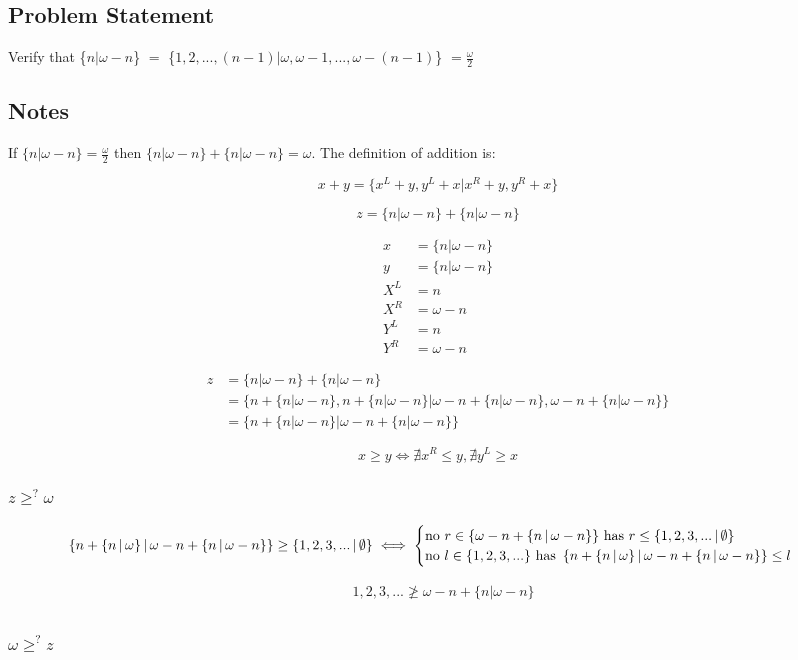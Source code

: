 \subsection*{Problem Statement}
\def \surr[#1][#2]{\{#1$|$#2\}}

Verify that \surr[$n$][$\omega - n$]
$=$
\surr[$1,2,...,(n - 1)$][$\omega, \omega - 1, ..., \omega - (n - 1)$]
$= \frac{\omega}{2}$

\subsection*{Notes}
If $\{n|\omega - n\}=\frac{\omega}{2}$ then $\{n|\omega - n\} + \{n|\omega - n\}=\omega$.  The definition of addition is:

\begin{equation*}
    x + y = \{x^L + y, y^L + x | x^R + y, y^R + x\}
\end{equation*}

\begin{equation*}
    z = \{n|\omega - n\} + \{n|\omega - n\}
\end{equation*}

\begin{align*}
    x &= \{n|\omega - n\} \\
    y &= \{n|\omega - n\} \\
    X^L &= n \\
    X^R &= \omega - n \\
    Y^L &= n \\
    Y^R &= \omega - n
\end{align*}

\begin{align*}
    z &= \{n|\omega - n\} + \{n|\omega - n\} \\
    &= \{n + \{n|\omega - n\}, n + \{n|\omega - n\} | \omega - n + \{n|\omega - n\}, \omega - n + \{n|\omega - n\}\} \\
    &= \{n + \{n|\omega - n\} | \omega - n + \{n|\omega - n\}\}
\end{align*}

\begin{equation*}
    x \geqslant y \Leftrightarrow \nexists x^R \leq y, \nexists y^L \geq x
\end{equation*}

\subsubsection*{$z \ge^? \omega$}

\surrealgeqexplain

$$\left\{n + \left\{n \,\middle|\, \omega\right\} \,\middle|\, \omega - n + \left\{n \,\middle|\, \omega - n\right\}\right\} \geq \left\{1, 2, 3, ... \,\middle|\, \emptyset\right\} \iff \begin{cases} \text{no } r \in \{\omega - n + \left\{n \,\middle|\, \omega - n\right\}\} \text{ has } r \leq \left\{1, 2, 3, ... \,\middle|\, \emptyset\right\} \\ \text{no } l \in \{1, 2, 3, ...\} \text{ has } \left\{n + \left\{n \,\middle|\, \omega\right\} \,\middle|\, \omega - n + \left\{n \,\middle|\, \omega - n\right\}\right\} \leq l \end{cases}$$

\begin{align*}
    &1, 2, 3, ... \ngeqslant \omega - n + \{n|\omega - n\} \\
    &
\end{align*}

\subsubsection*{$\omega \ge^? z$}